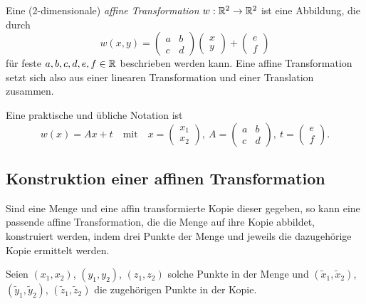 \documentclass[afourpaper]{tufte-handout}
\begin{document}
Eine (2-dimensionale) \emph{affine Transformation} \( w : \mathbb{R}^2 \to \mathbb{R}^2 \) ist eine Abbildung, die durch
\begin{equation*}
  w(x,y) = \begin{pmatrix}
    a & b \\ c & d
  \end{pmatrix} \begin{pmatrix}
    x \\ y
  \end{pmatrix} + \begin{pmatrix}
    e \\ f
  \end{pmatrix}
\end{equation*}
für feste \( a,b,c,d,e,f \in \mathbb{R} \) beschrieben werden kann. Eine affine Transformation setzt sich also aus einer linearen Transformation und einer Translation zusammen.

Eine praktische und übliche Notation ist
\begin{equation*}
  w(x) = Ax + t \quad \text{mit} \quad x = \begin{pmatrix}
    x_1 \\ x_2
  \end{pmatrix},\ A = \begin{pmatrix}
    a & b \\ c & d
  \end{pmatrix},\ t = \begin{pmatrix}
    e \\ f
  \end{pmatrix}\text{.}
\end{equation*}

\subsection{Konstruktion einer affinen Transformation}

Sind eine Menge und eine affin transformierte Kopie dieser gegeben, so kann eine passende affine Transformation, die die Menge auf ihre Kopie abbildet, konstruiert werden, indem drei Punkte der Menge und jeweils die dazugehörige Kopie ermittelt werden.

Seien \( (x_1, x_2) \), \( (y_1, y_2) \), \( (z_1, z_2) \) solche Punkte in der Menge und \( (\widetilde{x}_1, \widetilde{x}_2) \), \( (\widetilde{y}_1, \widetilde{y}_2) \), \( (\widetilde{z}_1, \widetilde{z}_2) \) die zugehörigen Punkte in der Kopie.
\end{document}
